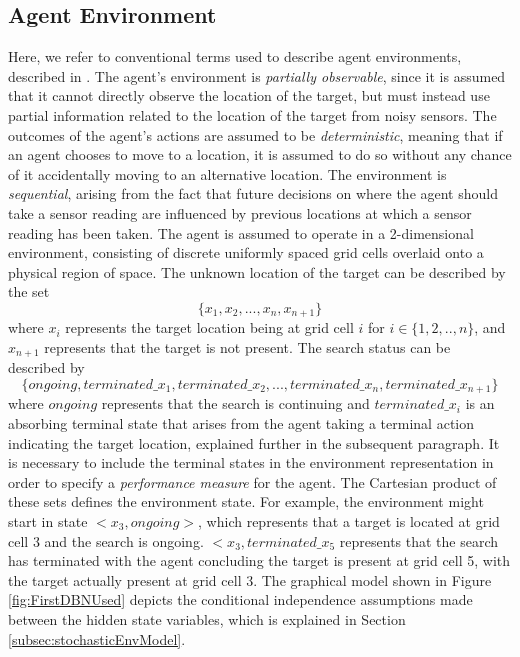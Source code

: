 \subsection{Agent Environment}
Here, we refer to conventional terms used to describe agent environments, described in \cite[p.~41]{AIAMA}. The agent's environment is \textit{partially observable}, since it is assumed that it cannot directly observe the location of the target, but must instead use partial information related to the location of the target from noisy sensors. The outcomes of the agent's actions are assumed to be \textit{deterministic}, meaning that if an agent chooses to move to a location, it is assumed to do so without any chance of it accidentally moving to an alternative location. The environment is \textit{sequential}, arising from the fact that future decisions on where the agent should take a sensor reading are influenced by previous locations at which a sensor reading has been taken. The agent is assumed to operate in a 2-dimensional environment, consisting of discrete uniformly spaced grid cells overlaid onto a physical region of space.
The unknown location of the target can be described by the set
\[\{x_1, x_2, ..., x_n, x_{n+1}\}\]
where $x_i$ represents the target location being at grid cell $i$ for $i \in \{1, 2, .., n\}$, and $x_{n+1}$ represents that the target is not present. The search status can be described by 
\[ \{ongoing, terminated\_x_1, terminated\_x_2, ..., terminated\_x_n, terminated\_x_{n+1}\} \]
where $ongoing$ represents that the search is continuing and $terminated\_x_i$ is an absorbing terminal state that arises from the agent taking a terminal action indicating the target location, explained further in the subsequent paragraph. It is necessary to include the terminal states in the environment representation in order to specify a \textit{performance measure} for the agent. 
The Cartesian product of these sets defines the environment state. For example, the environment might start in state $<x_3, ongoing>$, which represents that a target is located at grid cell 3 and the search is ongoing. $<x_3, terminated\_x_5$ represents that the search has terminated with the agent concluding the target is present at grid cell 5, with the target actually present at grid cell 3. The graphical model shown in Figure \ref{fig:FirstDBNUsed} depicts the conditional independence assumptions made between the hidden state variables, which is explained in Section \ref{subsec:stochasticEnvModel}.
